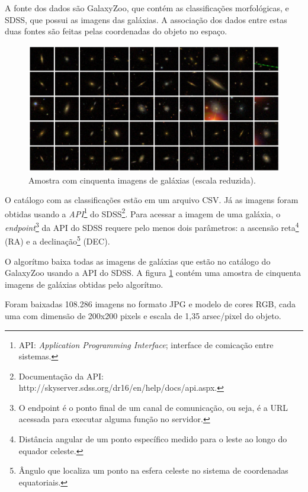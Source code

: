 A fonte dos dados são GalaxyZoo, que contém as classificações morfológicas, e SDSS, que possui as imagens das galáxias. A associação dos dados entre estas duas fontes são feitas pelas coordenadas do objeto no espaço.

\begin{figure}[h!]
  \centering
  \includegraphics[width=\textwidth]{figures/galaxy_grid.jpg}
  \caption{Amostra com cinquenta imagens de galáxias (escala reduzida).}
  \label{fig:galaxy_grid}
\end{figure}

O catálogo com as classificações estão em um arquivo CSV. Já as imagens foram obtidas usando a \emph{API}\footnote{API: \emph{Application Programming Interface}; interface de comicação entre sistemas.} do SDSS\footnote{Documentação da API: http://skyserver.sdss.org/dr16/en/help/docs/api.aspx.}. Para acessar a imagem de uma galáxia, o \emph{endpoint}\footnote{O endpoint é o ponto final de um canal de comunicação, ou seja, é a URL acessada para executar alguma função no servidor.} da API do SDSS requere pelo menos dois parâmetros: a ascensão reta\footnote{Distância angular de um ponto específico medido para o leste ao longo do equador celeste.} (RA) e a declinação\footnote{Ângulo que localiza um ponto na esfera celeste no sistema de coordenadas equatoriais.} (DEC).

O algorítmo\cite{cardoso2020} baixa todas as imagens de galáxias que estão no catálogo do GalaxyZoo usando a API do SDSS. A figura \ref{fig:galaxy_grid} contém uma amostra de cinquenta imagens de galáxias obtidas pelo algorítmo.

Foram baixadas 108.286 imagens no formato JPG e modelo de cores RGB, cada uma com dimensão de 200x200 pixels e escala de 1,35 arsec/pixel do objeto.

